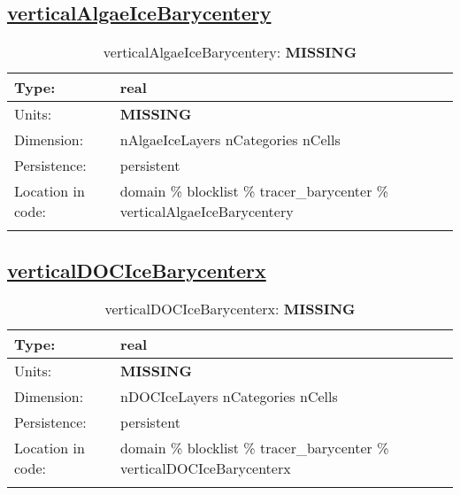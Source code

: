 \subsection[verticalAlgaeIceBarycentery]{\hyperref[sec:var_tab_tracer_barycenter]{verticalAlgaeIceBarycentery}}
\label{subsec:var_sec_tracer_barycenter_verticalAlgaeIceBarycentery}
\begin{center}
\begin{longtable}{| p{2.0in} | p{4.0in} |}
        \hline 
        Type: & real \\
        \hline 
        Units: & {\bf \color{red} MISSING} \\
        \hline 
        Dimension: & nAlgaeIceLayers nCategories nCells \\
        \hline 
        Persistence: & persistent \\
        \hline 
         Location in code: & domain \% blocklist \% tracer\_barycenter \% verticalAlgaeIceBarycentery \\
         \hline 
    \caption{verticalAlgaeIceBarycentery: {\bf \color{red} MISSING}}
\end{longtable}
\end{center}
\subsection[verticalDOCIceBarycenterx]{\hyperref[sec:var_tab_tracer_barycenter]{verticalDOCIceBarycenterx}}
\label{subsec:var_sec_tracer_barycenter_verticalDOCIceBarycenterx}
\begin{center}
\begin{longtable}{| p{2.0in} | p{4.0in} |}
        \hline 
        Type: & real \\
        \hline 
        Units: & {\bf \color{red} MISSING} \\
        \hline 
        Dimension: & nDOCIceLayers nCategories nCells \\
        \hline 
        Persistence: & persistent \\
        \hline 
         Location in code: & domain \% blocklist \% tracer\_barycenter \% verticalDOCIceBarycenterx \\
         \hline 
    \caption{verticalDOCIceBarycenterx: {\bf \color{red} MISSING}}
\end{longtable}
\end{center}
